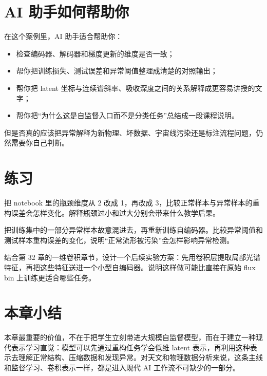 \section{AI 助手如何帮助你}

在这个案例里，AI 助手适合帮助你：

\begin{itemize}
    \item 检查编码器、解码器和梯度更新的维度是否一致；
    \item 帮你把训练损失、测试误差和异常阈值整理成清楚的对照输出；
    \item 帮你把 latent 坐标与连续谱斜率、吸收深度之间的关系解释成更容易讲授的文字；
    \item 帮你把“为什么这是自监督入口而不是分类任务”总结成一段课程说明。
\end{itemize}

但是否真的应该把异常解释为新物理、坏数据、宇宙线污染还是标注流程问题，仍然需要你自己判断。

\section{练习}

\begin{exercisebox}[基础练习]
把 notebook 里的瓶颈维度从 2 改成 1，再改成 3，比较正常样本与异常样本的重构误差会怎样变化。解释瓶颈过小和过大分别会带来什么教学后果。
\end{exercisebox}

\begin{exercisebox}[进阶练习]
把训练集中的一部分异常样本故意混进去，再重新训练自编码器。比较异常阈值和测试样本重构误差的变化，说明“正常流形被污染”会怎样影响异常检测。
\end{exercisebox}

\begin{exercisebox}[开放练习]
结合第 32 章的一维卷积章节，设计一个后续实验方案：先用卷积层提取局部光谱特征，再把这些特征送进一个小型自编码器。说明这样做可能比直接在原始 flux bin 上训练更适合哪些任务。
\end{exercisebox}

\section{本章小结}

本章最重要的价值，不在于把学生立刻带进大规模自监督模型，而在于建立一种现代表示学习直觉：模型可以先通过重构任务学会低维 latent 表示，再利用这种表示去理解正常结构、压缩数据和发现异常。对天文和物理数据分析来说，这条主线和监督学习、卷积表示一样，都是进入现代 AI 工作流不可缺少的一部分。
